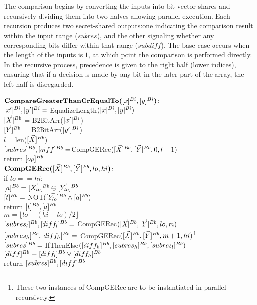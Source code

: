 The comparison begins by converting the inputs into bit-vector shares and recursively dividing them into two halves allowing parallel execution. Each recursion produces two secret-shared outputs:one indicating the comparison result within the input range ($subres$),  and the other signaling whether any corresponding bits differ within that range ($subdiff$). The base case occurs when the length of the inputs is $1$, at which point the comparison is performed directly. In the recursive process, precedence is given to the right half (lower indices), ensuring that if a decision is made by any bit in the later part of the array, the left half is disregarded.

\begin{protocol}	
	$\textbf{CompareGreaterThanOrEqualTo(}[x]^{Bi}, [y]^{Bi}\textbf{)}$:\\
	\indent $[x']^{Bi}, [y']^{Bi}=$ EqualizeLength$([x]^{Bi}, [y]^{Bi})$ \\
	\indent $[\vec{X}]^{Bb}$ = B2BitArr($[x']^{Bi}$)\\
	\indent $[\vec{Y}]^{Bb}$ = B2BitArr($[y']^{Bi}$)\\
	\indent $l = $len($[\vec{X}]^{Bb}$) \\
	\indent $[subres]^{Bb}, [diff]^{Bb} = $CompGERec$([\vec{X}]^{Bb}, [\vec{Y}]^{Bb}, 0, l-1)$ \\
	\indent return $[op]^{Bb}$ \\
	
	\noindent
	$\textbf{CompGERec(}[\vec{X}]^{Bb}, [\vec{Y}]^{Bb}, lo, hi\textbf{)}$:\\
	\indent if $lo == hi$: \\
	\indent \indent $[a]^{Bb} = [\vec{X_{lo}}]^{Bb} \oplus [\vec{Y_{lo}}]^{Bb}$ \\
	\indent \indent $[t]^{Bb} = $ NOT$([\vec{Y_{lo}}]^{Bb} \wedge [a]^{Bb})$ \\
	\indent \indent return $[t]^{Bb}, [a]^{Bb}$ \\
	\indent $m = \lfloor lo + (hi - lo)/2\rfloor$ \\
	\indent $[subres_l]^{Bb}, [diff_l]^{Bb} =$ CompGERec$([\vec{X}]^{Bb}, [\vec{Y}]^{Bb}, lo, m)$ \\
	\indent $[subres_h]^{Bb}, [diff_h]^{Bb} =$ CompGERec$([\vec{X}]^{Bb}, [\vec{Y}]^{Bb}, m + 1, hi)$\footnote{These two instances of CompGERec are to be instantiated in parallel recursively.} \\
	\indent $[subres]^{Bb} = $ IfThenElse$([diff_h]^{Bb}, [subres_h]^{Bb}, [subres_l]^{Bb})$ \\
	\indent $[diff]^{Bb} = [diff_l]^{Bb} \vee [diff_h]^{Bb}$ \\
	\indent return $[subres]^{Bb}, [diff]^{Bb}$
	
\end{protocol}

